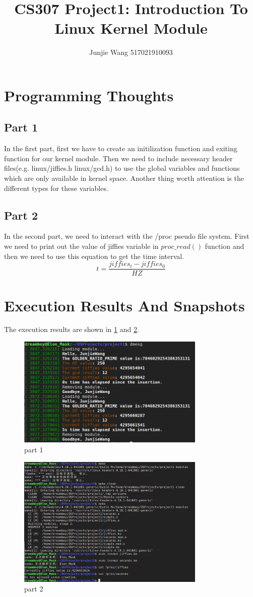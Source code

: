 \documentclass[12pt]{extarticle}
\title{CS307 Project1: Introduction To Linux Kernel Module}
\author{Junjie Wang 517021910093}
\newcommand{\<}{\langle}
\renewcommand{\>}{\rangle}
\theoremstyle{definition}
\begin{document}
	\maketitle
	\section{Programming Thoughts}
	\subsection{Part 1}
	In the first part, first we have to create an initilization function and exiting function for our kernel module. Then we need to include necessary header files(e.g. linux/jiffies.h linux/gcd.h) to use the global variables and functions which are only available in kernel space. Another thing worth attention is the different types for these variables.  
	\subsection{Part 2}
	In the second part, we need to interact with the /proc pseudo file system. First we need to print out the value of jiffies variable in $proc\_read()$ function and then we need to use this equation to get the time interval.
	$$t = \frac{jiffies_t - jiffies_0}{HZ} $$
	\section{Execution Results And Snapshots}
	The execution results are shown in \ref{fig1} and \ref{fig2}.
	\begin{figure}[H]
	\centering 
	\includegraphics[width=0.8\textwidth]{../imgs/1-1.png}
	\caption{part 1}
	\label{fig1}
	\end{figure}
	\begin{figure}[htbp]
	\centering
	\includegraphics[width=0.8\textwidth]{../imgs/1-2.png}
	\caption{part 2}
	\label{fig2}
	\end{figure} 
\end{document}
